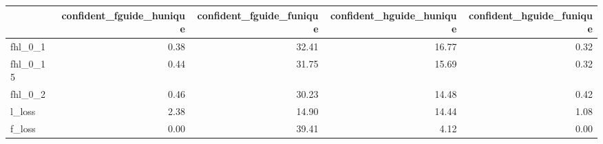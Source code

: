 \begin{tabular}{lrrrr}
\toprule
 & confident_fguide_hunique & confident_fguide_funique & confident_hguide_hunique & confident_hguide_funique \\
\midrule
fhl_0_1 & 0.38 & 32.41 & 16.77 & 0.32 \\
fhl_0_15 & 0.44 & 31.75 & 15.69 & 0.32 \\
fhl_0_2 & 0.46 & 30.23 & 14.48 & 0.42 \\
l_loss & 2.38 & 14.90 & 14.44 & 1.08 \\
f_loss & 0.00 & 39.41 & 4.12 & 0.00 \\
\bottomrule
\end{tabular}
